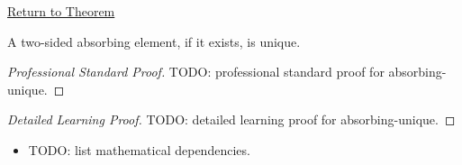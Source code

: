 \newpage
{}
\label{prf:absorbing-unique}

\begin{remark*}[Return]
\hyperref[prop:absorbing-unique]{Return to Theorem}
\end{remark*}

\begin{proposition*}
A two-sided absorbing element, if it exists, is unique.
\end{proposition*}

\begin{proof}[Professional Standard Proof]
\LRAProofBodyStart
TODO: professional standard proof for absorbing-unique.
\end{proof}

\begin{proof}[Detailed Learning Proof]
\LRAProofBodyStart
TODO: detailed learning proof for absorbing-unique.
\end{proof}

\begin{remark*}
\end{remark*}

\begin{dependencies}
\begin{itemize}
  \item TODO: list mathematical dependencies.
\end{itemize}
\end{dependencies}

\clearpage
